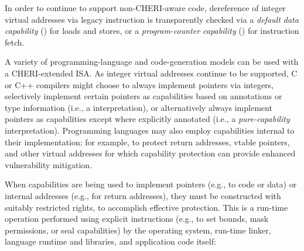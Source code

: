 In order to continue to support non-CHERI-aware code, dereference of integer
virtual addresses via legacy instruction is transparently checked via a
\textit{default data capability} (\DDC{}) for loads and stores, or a
\textit{program-counter capability} (\PCC{}) for instruction fetch.

A variety of programming-language and code-generation models can be used with
a CHERI-extended ISA.
As integer virtual addresses continue to be supported, C or C++ compilers
might choose to always implement pointers via integers, selectively implement
certain pointers as capabilities based on annotations or type information
(i.e., a  interpretation), or
alternatively
always implement pointers as
capabilities except where explicitly annotated (i.e., a
\textit{pure-capability} interpretation).
Programming languages may also employ capabilities internal to their
implementation: for example, to protect return addresses, vtable pointers, and
other virtual addresses for which capability protection can provide enhanced
vulnerability mitigation.

When capabilities are being used to implement pointers (e.g., to code or data)
or internal addresses (e.g., for return addresses), they must be
constructed with suitably restricted rights, to accomplish effective protection.
This is a run-time operation performed using explicit instructions (e.g., to
set bounds, mask permissions, or seal capabilities) by the operating system,
run-time linker, language runtime and libraries, and application code itself:

